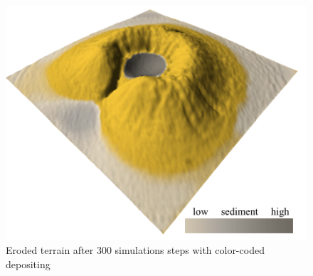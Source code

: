 \begin{figure}
	\centering
	\includegraphics[width=\linewidth]{NWD05/hydraulic_errosion_d}
	\caption{Eroded terrain after 300 simulations steps with color-coded depositing}
	\label{fig:calc_acceleration}
\end{figure}